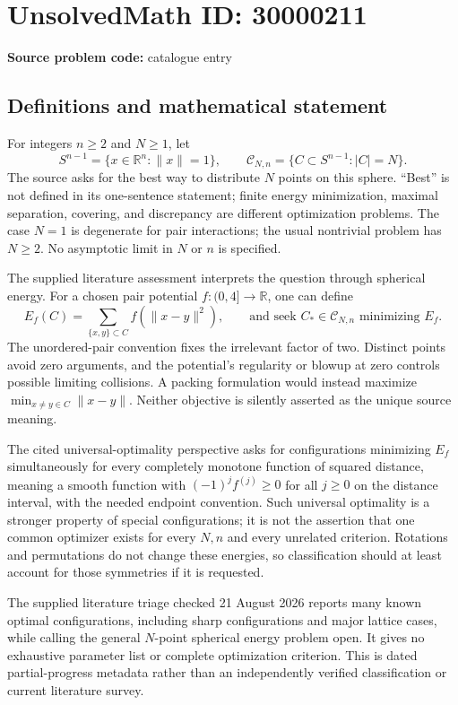 \documentclass[11pt]{article}
\newcommand{\R}{\mathbb{R}}
\begin{document}
\section*{UnsolvedMath ID: 30000211}
\textbf{Source problem code:} catalogue entry
\subsection{Definitions and mathematical statement}
For integers $n\geq2$ and $N\geq1$, let
\[
 S^{n-1}=\{x\in\R^n:\|x\|=1\},\qquad
 \mathcal C_{N,n}=\{C\subset S^{n-1}:|C|=N\}.
\]
The source asks for the best way to distribute $N$ points on this sphere. ``Best'' is not defined in its one-sentence statement; finite energy minimization, maximal separation, covering, and discrepancy are different optimization problems. The case $N=1$ is degenerate for pair interactions; the usual nontrivial problem has $N\geq2$. No asymptotic limit in $N$ or $n$ is specified.

The supplied literature assessment interprets the question through spherical energy. For a chosen pair potential $f:(0,4]\to\R$, one can define
\[
 E_f(C)=\sum_{\{x,y\}\subset C}f(\|x-y\|^2),\qquad
 \text{and seek }C_*\in\mathcal C_{N,n}\text{ minimizing }E_f.
\]
The unordered-pair convention fixes the irrelevant factor of two. Distinct points avoid zero arguments, and the potential's regularity or blowup at zero controls possible limiting collisions. A packing formulation would instead maximize $\min_{x\ne y\in C}\|x-y\|$. Neither objective is silently asserted as the unique source meaning.

The cited universal-optimality perspective asks for configurations minimizing $E_f$ simultaneously for every completely monotone function of squared distance, meaning a smooth function with $(-1)^j f^{(j)}\geq0$ for all $j\geq0$ on the distance interval, with the needed endpoint convention. Such universal optimality is a stronger property of special configurations; it is not the assertion that one common optimizer exists for every $N,n$ and every unrelated criterion. Rotations and permutations do not change these energies, so classification should at least account for those symmetries if it is requested.

The supplied literature triage checked 21 August 2026 reports many known optimal configurations, including sharp configurations and major lattice cases, while calling the general $N$-point spherical energy problem open. It gives no exhaustive parameter list or complete optimization criterion. This is dated partial-progress metadata rather than an independently verified classification or current literature survey.
\end{document}
